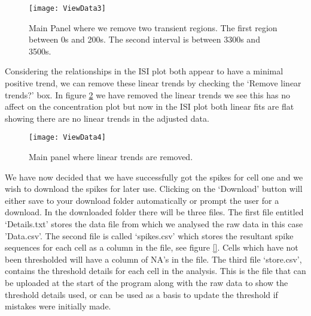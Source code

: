 \documentclass[../main.tex]{subfiles}
\begin{document}
\begin{figure}[t]
	\texttt{[image: ViewData3]}
	\caption{Main Panel where we remove two transient regions. The first region between 0s and 200s. The second interval is between 3300s and 3500s.}
	\label{fig: ViewData3}
\end{figure}

Considering the relationships in the ISI plot both appear to have a minimal positive trend, we can remove these linear trends by checking the `Remove linear trends?' box. In figure \ref{fig: ViewData4} we have removed the linear trends we see this has no affect on the concentration plot but now in the ISI plot both linear fits are flat showing there are no linear trends in the adjusted data. 

\begin{figure}[t]
	\texttt{[image: ViewData4]}
	\caption{Main panel where linear trends are removed.}
	\label{fig: ViewData4}
\end{figure}

We have now decided that we have successfully got the spikes for cell one and we wish to download the spikes for later use. Clicking on the `Download' button will either save to your download folder automatically or prompt the user for a download. In the downloaded folder there will be three files. The first file entitled `Details.txt' stores the data file from which we analysed the raw data in this case 'Data.csv'. The second file is called `spikes.csv' which stores the resultant spike sequences for each cell as a column in the file, see figure \ref{}. Cells which have not been thresholded will have a column of NA's in the file. The third file `store.csv', contains the threshold details for each cell in the analysis. This is the file that can be uploaded at the start of the program along with the raw data to show the threshold details used, or can be used as a basis to update the threshold if mistakes were initially made. 
\end{document}
